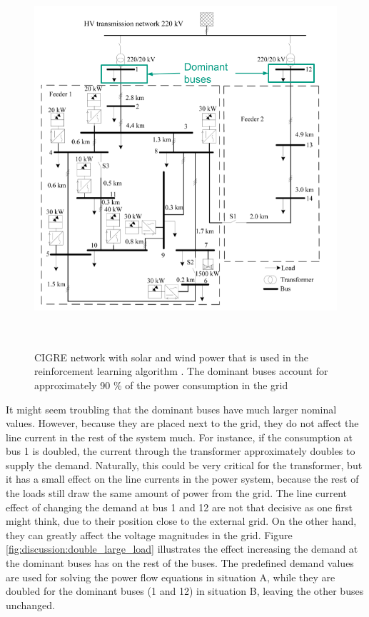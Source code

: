 \documentclass[class=book, crop=false, 11pt]{standalone}
\begin{document}
\begin{figure}[ht!]
    \center
    \includegraphics[height=14cm, width=13.5cm]{figures/cigre_network_dominant.png}
    \caption[size = 9]{CIGRE network with solar and wind power that is used in the reinforcement learning algorithm \cite{cigre}. The dominant buses account for approximately 90 \% of the power consumption in the grid}
    \label{fig:discussion:cigre_network_dominant}
\end{figure}
It might seem troubling that the dominant buses have much larger nominal values. However, because they are placed next to the grid, they do not affect the line current in the rest of the system much. For instance, if the consumption at bus 1 is doubled, the current through the transformer approximately doubles to supply the demand. Naturally, this could be very critical for the transformer, but it has a small effect on the line currents in the power system, because the rest of the loads still draw the same amount of power from the grid. The line current effect of changing the demand at bus 1 and 12 are not that decisive as one first might think, due to their position close to the external grid. On the other hand, they can greatly affect the voltage magnitudes in the grid. Figure \ref{fig:discussion:double_large_load} illustrates the effect increasing the demand at the dominant buses has on the rest of the buses. The predefined demand values are used for solving the power flow equations in situation A, while they are doubled for the dominant buses (1 and 12) in situation B, leaving the other buses unchanged.
\end{document}
